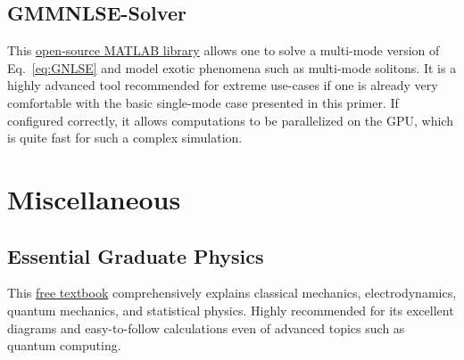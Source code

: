 \subsection*{GMMNLSE-Solver}
This \href{https://github.com/WiseLabAEP/GMMNLSE-Solver-FINAL}{open-source MATLAB library} allows one to solve a multi-mode version of Eq.~\ref{eq:GNLSE} and model exotic phenomena such as multi-mode solitons. It is a highly advanced tool recommended for extreme use-cases if one is already very comfortable with the basic single-mode case presented in this primer. If configured correctly, it allows computations to be parallelized on the GPU, which is quite fast for such a complex simulation. 


\section{Miscellaneous}

\subsection{Essential Graduate Physics}
This \href{https://commons.library.stonybrook.edu/egp/}{free textbook} comprehensively explains classical mechanics, electrodynamics, quantum mechanics, and statistical physics. Highly recommended for its excellent diagrams and easy-to-follow calculations even of advanced topics such as quantum computing.  